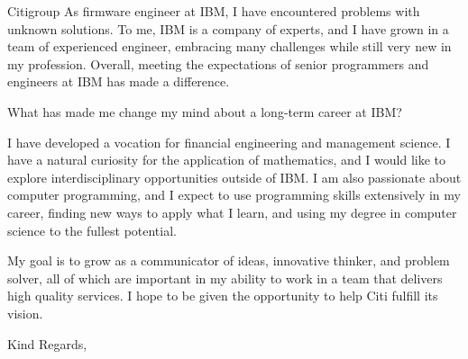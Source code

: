 \documentclass[11pt]{letter} %
\begin{document}
\begin{letter}{
Citigroup
}
As firmware engineer at IBM, I have encountered problems with unknown solutions. To me, IBM is a company of experts, and I have grown in a team of experienced engineer, embracing many challenges while still very new in my profession. Overall, meeting the expectations of senior programmers and engineers at IBM has made a difference.

What has made me change my mind about a long-term career at IBM?

I have developed a vocation for financial engineering and management science. I have a natural curiosity for the application of mathematics, and I would like to explore interdisciplinary opportunities outside of IBM. I am also passionate about computer programming, and I expect to use programming skills extensively in my career, finding new ways to apply what I learn, and using my degree in computer science to the fullest potential.

My goal is to grow as a communicator of ideas, innovative thinker, and problem solver, all of which are important in my ability to work in a team that delivers high quality services. I hope to be given the opportunity to help Citi fulfill its vision.

\closing{{Kind Regards,} \\
 \\
}


\end{letter}
\end{document}
